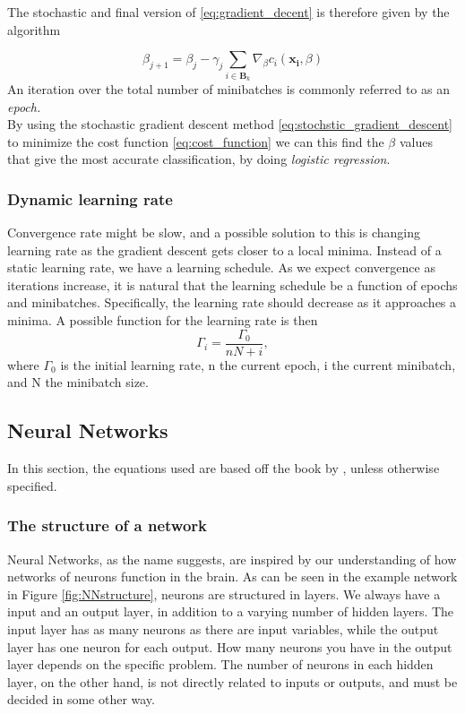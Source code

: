 The stochastic and final version of \eqref{eq:gradient_decent} is therefore given by the algorithm

\begin{equation}
    \beta_{j+1} = \beta_j - \gamma_j \sum_{i \in \boldsymbol{B}_k}\nabla_\beta c_i(\boldsymbol{x_i},\beta)
    \label{eq:stochstic_gradient_descent}
\end{equation}
An iteration over the total number of minibatches is commonly referred to as an \textit{epoch.}\\

By using the stochastic gradient descent method \eqref{eq:stochstic_gradient_descent} to minimize the cost function \eqref{eq:cost_function} we can this find the $\beta$ values that give the most accurate classification, by doing \textit{logistic regression}.

\subsubsection*{Dynamic learning rate}
Convergence rate might be slow, and a possible solution to this is changing learning rate as
the gradient descent gets closer to a local minima. Instead of a static learning rate, we have a learning schedule. As we expect convergence as iterations increase, it is natural that the learning schedule
be a function of epochs and minibatches. Specifically, the learning rate should decrease as it approaches a minima.
A possible function for the learning rate is then
  \begin{equation}
    \label{eq:learning_schedule}
    \Gamma_{i} = \frac{\Gamma_0}{nN+i},
  \end{equation}
where $\Gamma_{0}$ is the initial learning rate, n the current epoch, i the current minibatch,
and N the minibatch size.

\subsection{Neural Networks}
In this section, the equations used are based off the book by \cite{Nielsen}, unless otherwise specified.
\subsubsection*{The structure of a network}
Neural Networks, as the name suggests, are inspired by our understanding of how networks of neurons function in the brain. As can be seen in the example network in Figure \ref{fig:NNstructure}, neurons are structured in layers. We always have a input and an output layer, in addition to a varying number of hidden layers. The input layer has as many neurons as there are input variables, while the output layer has one neuron for each output. How many neurons you have in the output layer depends on the specific problem. The number of neurons in each hidden layer, on the other hand, is not directly related to inputs or outputs, and must be decided in some other way.

